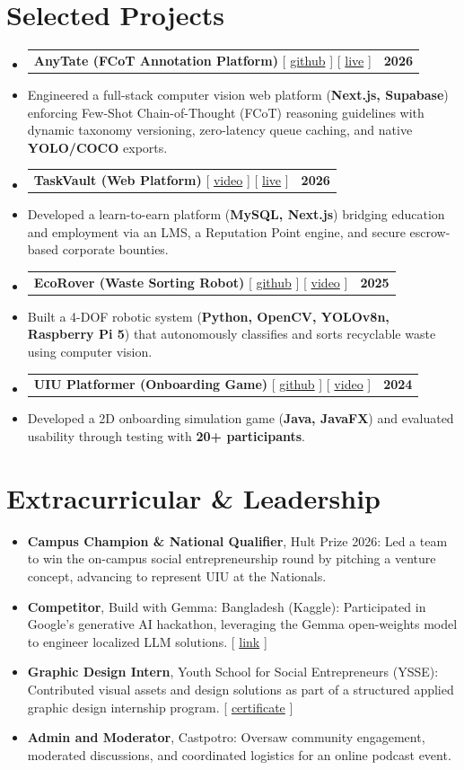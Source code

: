 \documentclass[letterpaper,9pt]{article}
\makeatletter
\newcommand{\resumeItem}[1]{
  \item\small{
    {#1 \vspace{1pt}}
  }
}
\newcommand{\resumeProjectHeading}[2]{
    \item
    \begin{tabular*}{0.97\textwidth}{l@{\extracolsep{\fill}}r}
      \small#1 & \textcolor{AccentColor}{\textbf{#2}} \\
    \end{tabular*}\vspace{-2pt}
}
\newcommand{\resumeSubHeadingListStart}{\begin{itemize}[leftmargin=0.15in, label={}, itemsep=1pt]}
\newcommand{\resumeSubHeadingListEnd}{\end{itemize}\vspace{-10pt}}
\newcommand{\resumeItemListStart}{\begin{itemize}[label={\textcolor{AccentColor}{$\bullet$}}, itemsep=2pt]}
\newcommand{\resumeItemListEnd}{\end{itemize}\vspace{-10pt}}
\makeatother
\begin{document}
\section{Selected Projects}
    \resumeSubHeadingListStart
      \resumeProjectHeading
          {\textbf{AnyTate (FCoT Annotation Platform)} [ \href{https://github.com/MinhazFuad/anytate}{github} ] [ \href{https://anytate.vercel.app/}{live} ]}{2026}
      \resumeItem{Engineered a full-stack computer vision web platform (\textbf{Next.js, Supabase}) enforcing Few-Shot Chain-of-Thought (FCoT) reasoning guidelines with dynamic taxonomy versioning, zero-latency queue caching, and native \textbf{YOLO/COCO} exports.}
      \resumeProjectHeading
          {\textbf{TaskVault (Web Platform)} [ \href{https://drive.google.com/file/d/1l0gBWt-Lne4dovaSc0nrUt3lpwgyYOGc/view?usp=sharing}{video} ] [ \href{https://taskvault-learn.vercel.app/}{live} ]}{2026}
      \resumeItem{Developed a learn-to-earn platform (\textbf{MySQL, Next.js}) bridging education and employment via an LMS, a Reputation Point engine, and secure escrow-based corporate bounties.}
      \resumeProjectHeading
          {\textbf{EcoRover (Waste Sorting Robot)} [ \href{https://github.com/TheAhsanFarabi/EcoRover}{github} ] [ \href{https://youtu.be/bar47waowf8?si=LwgsXSzO4obR1Ytv}{video} ]}{2025}
      \resumeItem{Built a 4-DOF robotic system (\textbf{Python, OpenCV, YOLOv8n, Raspberry Pi 5}) that autonomously classifies and sorts recyclable waste using computer vision.}
      \resumeProjectHeading
          {\textbf{UIU Platformer (Onboarding Game)} [ \href{https://github.com/TheAhsanFarabi/UIU-Platformer-Game}{github} ] [ \href{https://youtu.be/ylTclQSRTeg?si=-GbPpa2ds2V7o0aX}{video} ]}{2024}
      \resumeItem{Developed a 2D onboarding simulation game (\textbf{Java, JavaFX}) and evaluated usability through testing with \textbf{20+ participants}.}
    \resumeSubHeadingListEnd
    
\section{Extracurricular \& Leadership}
\resumeItemListStart
  \resumeItem{\textbf{Campus Champion \& National Qualifier}, Hult Prize 2026: Led a team to win the on-campus social entrepreneurship round by pitching a venture concept, advancing to represent UIU at the Nationals.}
  \resumeItem{\textbf{Competitor}, Build with Gemma: Bangladesh (Kaggle): Participated in Google's generative AI hackathon, leveraging the Gemma open-weights model to engineer localized LLM solutions. [ \href{https://www.kaggle.com/competitions/build-with-gemma-bangladesh/overview}{link} ]}
  \resumeItem{\textbf{Graphic Design Intern}, Youth School for Social Entrepreneurs (YSSE): Contributed visual assets and design solutions as part of a structured applied graphic design internship program. [ \href{https://script.google.com/macros/s/AKfycbyRvr3laSy_r6coxLSgSmaGDuyG0nVVWMXgxllN90he_2XRDRC9_AemkKChmA0aP-qLtQ/exec?id=fuad000219\%40gmail.com}{certificate} ]}
  \resumeItem{\textbf{Admin and Moderator}, Castpotro: Oversaw community engagement, moderated discussions, and coordinated logistics for an online podcast event.}
\resumeItemListEnd
    
\end{document}
